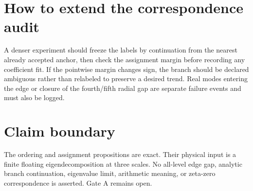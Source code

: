 \documentclass[12pt]{article}
\theoremstyle{remark}\newtheorem{remark}[theorem]{Remark}
\begin{document}
\section{How to extend the correspondence audit}

A denser experiment should freeze the labels by continuation from the
nearest already accepted anchor, then check the assignment margin before
recording any coefficient fit.  If the pointwise margin changes sign, the
branch should be declared ambiguous rather than relabeled to preserve a
desired trend.  Real modes entering the edge or closure of the fourth/fifth
radial gap are separate failure events and must also be logged.

\section{Claim boundary}

The ordering and assignment propositions are exact.  Their physical input is
a finite floating eigendecomposition at three scales.  No all-level edge
gap, analytic branch continuation, eigenvalue limit, arithmetic meaning, or
zeta-zero correspondence is asserted.  Gate A remains open.


\end{document}
